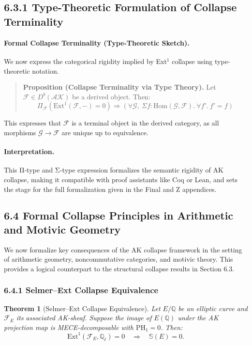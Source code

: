 \documentclass[11pt]{article}
\newcommand{\Sha}{\mathbb{S}}
\newtheorem{theorem}{Theorem}[section]
\begin{document}
\subsection*{6.3.1 Type-Theoretic Formulation of Collapse Terminality}

\paragraph{Formal Collapse Terminality (Type-Theoretic Sketch).}
We now express the categorical rigidity implied by Ext$^1$ collapse using type-theoretic notation.

\begin{quote}
\textbf{Proposition (Collapse Terminality via Type Theory).}  
Let \( \mathcal{F} \in D^b(\mathcal{AK}) \) be a derived object.  
Then:
\[
\Pi_{\mathcal{F}} \left( \mathrm{Ext}^1(\mathcal{F}, -) = 0 \right) \Rightarrow  
\left( \forall \mathcal{G},\ \Sigma f : \mathrm{Hom}(\mathcal{G}, \mathcal{F}).\ \forall f'.\ f' = f \right)
\]
\end{quote}

This expresses that \( \mathcal{F} \) is a terminal object in the derived category,  
as all morphisms \( \mathcal{G} \to \mathcal{F} \) are unique up to equivalence.

\paragraph{Interpretation.}
This Π-type and Σ-type expression formalizes the semantic rigidity of AK collapse,  
making it compatible with proof assistants like Coq or Lean, and sets the stage for the full formalization given in the Final and Z appendices.


\subsection{6.4 Formal Collapse Principles in Arithmetic and Motivic Geometry}

We now formalize key consequences of the AK collapse framework in the setting of arithmetic geometry, noncommutative categories, and motivic theory. This provides a logical counterpart to the structural collapse results in Section 6.3.

\subsubsection*{6.4.1 Selmer–Ext Collapse Equivalence}

\begin{theorem}[Selmer–Ext Collapse Equivalence]
Let \( E/\mathbb{Q} \) be an elliptic curve and \( \mathcal{F}_E \) its associated AK-sheaf. Suppose the image of \( E(\mathbb{Q}) \) under the AK projection map is MECE-decomposable with \( \mathrm{PH}_1 = 0 \). Then:
\[
\mathrm{Ext}^1(\mathcal{F}_E, \mathbb{Q}_\ell) = 0 \quad \Rightarrow \quad \Sha(E) = 0.
\]
\end{theorem}
\end{document}

